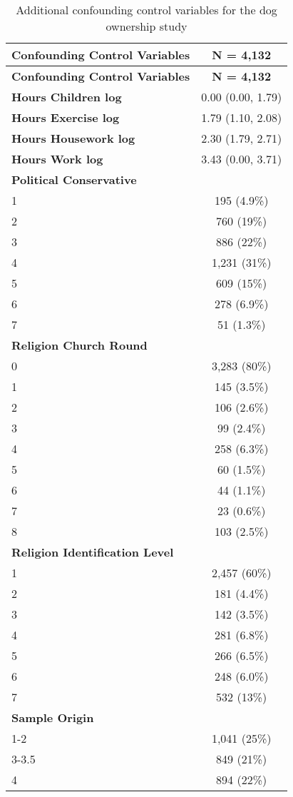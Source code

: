 \documentclass[
  singlecolumn,
  9pt]{article}
\begin{document}
\newpage{}

\begin{longtable}[]{@{}lc@{}}
\caption{Additional confounding control variables for the dog ownership
study}\label{tbl-table_confounding_control_vars_dogs-m}\tabularnewline
\toprule\noalign{}
\textbf{Confounding Control Variables} & \textbf{N = 4,132} \\
\midrule\noalign{}
\endfirsthead
\toprule\noalign{}
\textbf{Confounding Control Variables} & \textbf{N = 4,132} \\
\midrule\noalign{}
\endhead
\bottomrule\noalign{}
\endlastfoot
\textbf{Hours Children log} & 0.00 (0.00, 1.79) \\
\textbf{Hours Exercise log} & 1.79 (1.10, 2.08) \\
\textbf{Hours Housework log} & 2.30 (1.79, 2.71) \\
\textbf{Hours Work log} & 3.43 (0.00, 3.71) \\
\textbf{Political Conservative} & \\
1 & 195 (4.9\%) \\
2 & 760 (19\%) \\
3 & 886 (22\%) \\
4 & 1,231 (31\%) \\
5 & 609 (15\%) \\
6 & 278 (6.9\%) \\
7 & 51 (1.3\%) \\
\textbf{Religion Church Round} & \\
0 & 3,283 (80\%) \\
1 & 145 (3.5\%) \\
2 & 106 (2.6\%) \\
3 & 99 (2.4\%) \\
4 & 258 (6.3\%) \\
5 & 60 (1.5\%) \\
6 & 44 (1.1\%) \\
7 & 23 (0.6\%) \\
8 & 103 (2.5\%) \\
\textbf{Religion Identification Level} & \\
1 & 2,457 (60\%) \\
2 & 181 (4.4\%) \\
3 & 142 (3.5\%) \\
4 & 281 (6.8\%) \\
5 & 266 (6.5\%) \\
6 & 248 (6.0\%) \\
7 & 532 (13\%) \\
\textbf{Sample Origin} & \\
1-2 & 1,041 (25\%) \\
3-3.5 & 849 (21\%) \\
4 & 894 (22\%) \\
\end{longtable}
\end{document}
